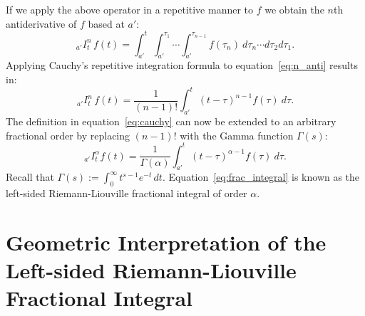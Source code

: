 \documentclass[twoside,reqno,11pt]{fcaa-var} %
\begin{document}
\noindent
If we apply the above operator in a repetitive manner to $f$ we obtain the $n$th antiderivative of $f$ based at $a'$:
\begin{equation}
\label{eq:n_anti}
_{a'}I_t^n\,f(t) = \int_{a'}^t\int_{a'}^{\tau_1}\cdots \int_{a'}^{\tau_{n-1}}f(\tau_n)~d\tau_n\cdots d\tau_2 d\tau_1.
\end{equation}
Applying Cauchy's repetitive integration formula to equation~\eqref{eq:n_anti} results in:
\begin{equation}
\label{eq:cauchy}
_{a'}I_t^n\,f(t) = \frac{1}{(n-1)!}\int_{a'}^t (t-\tau)^{n-1}f(\tau)~d\tau.
\end{equation}
The definition in equation~\eqref{eq:cauchy} can now be extended to an arbitrary fractional order by replacing $(n-1)!$ with the Gamma function $\Gamma(s)$:
\begin{equation}
\label{eq:frac_integral}
_{a'}I_t^{\alpha}f(t) = \frac{1}{\Gamma(\alpha)}\int_{a'}^t (t-\tau)^{\alpha-1}f(\tau)~d\tau.
\end{equation}
Recall that $\Gamma(s) := \int_0^{\infty} t^{s-1} e^{-t}\,dt$. Equation~\eqref{eq:frac_integral} is known as the left-sided Riemann-Liouville fractional integral of order $\alpha$. 


\section{Geometric Interpretation of the Left-sided Riemann-Liouville Fractional Integral}
\end{document}
